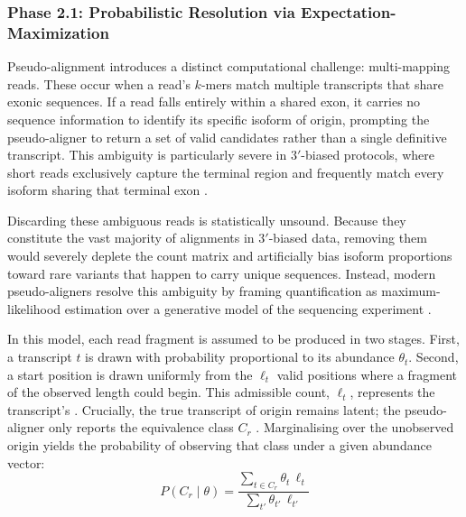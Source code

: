 \subsubsection{Phase 2.1: Probabilistic Resolution via Expectation-Maximization}

Pseudo-alignment introduces a distinct computational challenge: multi-mapping reads. These occur when a read's $k$-mers match multiple transcripts that share exonic sequences. If a read falls entirely within a shared exon, it carries no sequence information to identify its specific isoform of origin, prompting the pseudo-aligner to return a set of valid candidates rather than a single definitive transcript. This ambiguity is particularly severe in $3'$-biased protocols, where short reads exclusively capture the terminal region and frequently match every isoform sharing that terminal exon \cite{galfre2021cotan}.

Discarding these ambiguous reads is statistically unsound. Because they constitute the vast majority of alignments in $3'$-biased data, removing them would severely deplete the count matrix and artificially bias isoform proportions toward rare variants that happen to carry unique sequences. Instead, modern pseudo-aligners resolve this ambiguity by framing quantification as maximum-likelihood estimation over a generative model of the sequencing experiment \cite{patro2017salmon}.

In this model, each read fragment is assumed to be produced in two stages. First, a transcript $t$ is drawn with probability proportional to its abundance $\theta_t$. Second, a start position is drawn uniformly from the $\ell_t$ valid positions where a fragment of the observed length could begin. This admissible count, $\ell_t$, represents the transcript's . Crucially, the true transcript of origin remains latent; the pseudo-aligner only reports the equivalence class $C_r$ \cite{bray2016near}. Marginalising over the unobserved origin yields the probability of observing that class under a given abundance vector:
$$ P(C_r \mid \theta) = \frac{\sum_{t \in C_r} \theta_t \, \ell_t}{\sum_{t'} \theta_{t'} \, \ell_{t'}} $$

